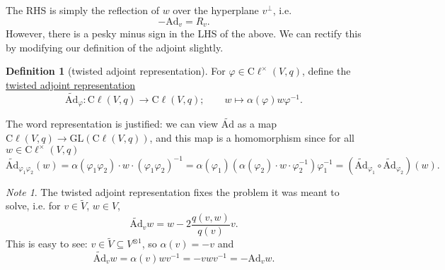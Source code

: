 \documentclass[a4paper]{report}
\newcommand{\defn}[1]{\ul{#1}}
\newcommand{\cliff}{\mathrm{C}\ell}
\newcommand{\Ad}{\mathrm{Ad}}
\newcommand{\tAd}{\widetilde{\mathrm{Ad}}}
\newcommand{\GL}{\mathrm{GL}}
\theoremstyle{definition}
\newtheorem{definition}{Definition}[section]
\theoremstyle{plain}
\theoremstyle{remark}
\newtheorem{note}{Note}[section]
\begin{document}
The RHS is simply the reflection of $w$ over the hyperplane $v^{\perp}$, i.e.
\begin{equation*}
  -\Ad_{v} = R_{v}.
\end{equation*}
However, there is a pesky minus sign in the LHS of the above. We can rectify this by modifying our definition of the adjoint slightly.

\begin{definition}[twisted adjoint representation]
  \label{def:twistedadjointrepresentation}
  For $\varphi \in \cliff^{\times}(V, q)$, define the \defn{twisted adjoint representation}
  \begin{equation*}
    \tAd_{\varphi}\colon \cliff(V, q) \to \cliff(V, q);\qquad w \mapsto \alpha(\varphi)w\varphi^{-1}.
  \end{equation*}

  The word representation is justified: we can view $\tAd$ as a map $\cliff(V, q) \to \GL(\cliff(V, q))$, and this map is a homomorphism since for all $w \in \cliff^{\times}(V, q)$
  \begin{equation*}
    \tAd_{\varphi_{1}\varphi_{2}}(w) = \alpha(\varphi_{1} \varphi_{2}) \cdot w \cdot (\varphi_{1} \varphi_{2})^{-1} = \alpha(\varphi_{1}) \left( \alpha(\varphi_{2}) \cdot w \cdot \varphi_{2}^{-1} \right) \varphi_{1}^{-1} = (\tAd_{\varphi_{1}} \circ \tAd_{\varphi_{2}})(w).
  \end{equation*}
\end{definition}

\begin{note}
  The twisted adjoint representation fixes the problem it was meant to solve, i.e. for $v \in \tilde{V}$, $w \in V$,
  \begin{equation*}
    \tAd_{v}w = w - 2\frac{q(v, w)}{q(v)}v.
  \end{equation*}
  This is easy to see: $v \in \tilde{V} \subseteq V^{\otimes 1}$, so $\alpha(v) = -v$ and
  \begin{equation*}
    \tAd_{v}w = \alpha(v) w v^{-1} = -v w v^{-1} = -\Ad_{v} w.
  \end{equation*}
\end{note}
\end{document}

